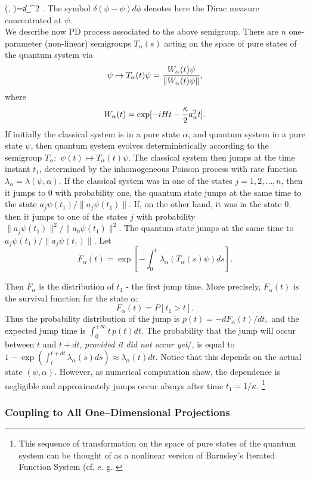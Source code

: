 \documentclass[12pt]{article}
\begin{document}
\lambda  (\psi , \alpha )=\kappa \| a_\alpha\psi\|^2 . 
\ee 
The symbol $\delta \left (\phi - \psi\right)d\phi$ denotes here the
Dirac measure concentrated at $\psi . $\\
We describe now PD process associated to the above semigroup. 
There are $n$ one-parameter  (non-linear) semigroups $T_\alpha  (s)$ acting on the 
space  of pure states of the quantum system via
$$\psi \mapsto T_\alpha  (t) \psi ={ W_\alpha  (t) \psi  \over
\| W_\alpha  (t)\psi \|}, $$ where
$$W_\alpha  (t)=\exp[-iHt-{\kappa\over 2} a_\alpha^2 t]. $$ If initially the
classical system is in a pure state $\alpha$,   and quantum system  in
a pure state
$\psi$,   then quantum system evolves deterministically according to the 
semigroup
$T_\alpha$:\, $\psi (t)\mapsto T_\alpha  (t)\psi$. 
 The classical system then jumps at
the time instant
$t_1$,  determined by  the inhomogeneous Poisson process with rate function
$\lambda_\alpha = \lambda(\psi,\alpha)$.
If the classical system was in one of the states
$j=1, 2, \ldots , n$,  then it jumps to
$0$ with probability one,  the quantum state jumps at the same time to the state
$a_j\psi  (t_1) / \| a_j\psi  (t_1)\|$. 
If,  on the other hand,  it was in the state $0$,  then it jumps to one of the
states $j$ with  probability
$\|a_j\psi  (t_1)\|^2/\|a_0 \psi  (t_1)\|^2$.  The quantum state jumps at the same
time to
$a_j\psi (t_1)/\|a_j\psi (t_1)\|. $ Let 
$$F_\alpha  (t)=\exp[-\int_0^t \lambda_\alpha  (T_\alpha  (s)\psi)ds]. $$
 
Then $F_\alpha$ is the distribution of $t_1$ - the first jump time.  More
precisely, 
$F_\alpha  (t)$ is the survival function for the state $\alpha$:
$$F_\alpha  (t) = P[t_1> t]. $$ Thus the probability distribution of the jump is
$p (t)=-dF_\alpha  (t)/dt ,  $ and the expected jump time is $\int_0^{+\infty } t\, 
p (t) dt. $  The probability that the jump will occur between $t$ and
$t+dt$, {\sl provided it did not occur yet}/, is
equal to
$1-\exp\left(\int_t^{t+dt}\lambda_{\alpha}(s)ds\right)\approx
\lambda_{\alpha}(t)dt$.
Notice that this depends on the actual state $(\psi,\alpha)$.
However,  as numerical
computation show,  the dependence  is negligible and approximately
 jumps occur always after time $t_1=1/\kappa$.%
\footnote{This sequence of transformation on the space of pure states of the
quantum system can be thought of as a nonlinear version of Barnsley's Iterated
Function System  (cf.  e. g.  \cite{bar}  }
\subsubsection{Coupling to All One--Dimensional Projections}
\end{document}
